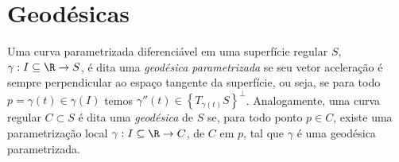 \section{Geodésicas}

\begin{defn}
    Uma curva parametrizada diferenciável em uma superfície regular \( S \), \( \gamma : I \subseteq \R \to S \), é dita uma \emph{geodésica parametrizada} se seu vetor aceleração é sempre perpendicular ao espaço tangente da superfície, ou seja, se para todo \( p = \gamma ( t ) \in \gamma ( I ) \) temos \( \gamma'' ( t ) \in \left\{ T_{ \gamma ( t ) } S \right\}^{ \perp } \).
    Analogamente, uma curva regular \( C \subset S \) é dita uma \emph{geodésica} de \( S \) se, para todo ponto \( p \in C \), existe uma parametrização local \( \gamma : I \subseteq \R \to C \), de \( C \) em \( p \), tal que \( \gamma \) é uma geodésica parametrizada.

    
\end{defn}

